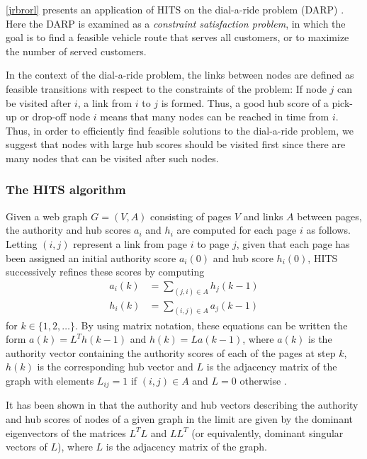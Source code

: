 \documentclass[dissertation,draft*]{aaltoseries}
\begin{document}
\ref{jrbrorl} presents an application of HITS on the dial-a-ride problem (DARP)
\cite{berbegliathesis,berbegliahybrid,berbegliafeas}.
Here the DARP is examined as a \emph{constraint satisfaction problem}, in which the goal
is to find a feasible vehicle route that serves all customers, or to maximize the number of served customers.

In the context of the dial-a-ride problem, 
the links between nodes are defined as feasible transitions with respect to the %
constraints of the problem: If node $j$ can be visited after $i$, a link from $i$ to $j$ 
is formed. Thus, a good hub score of a pick-up or drop-off node $i$ means 
that many nodes can be reached in time from $i$. 
Thus, in order to efficiently find feasible solutions to the dial-a-ride problem, we suggest that nodes with large 
hub scores should be visited first since there are many nodes that can
be visited after such nodes. 


\subsubsection{The HITS algorithm \cite{kleinberg}}
\label{hits}
Given a web graph $G = (V,A)$ consisting of pages $V$ and links $A$ between pages,
the authority and hub scores $a_i$ and $h_i$ are computed for each page $i$ as follows.
Letting 
$(i,j)$ represent a link from page $i$ to page $j$, given that each page has been 
assigned an initial authority score $a_i(0)$ and hub score $h_i(0)$, HITS successively
refines these scores by computing
\begin{align*}
a_i(k) & = \sum_{(j,i) \in A} h_j(k-1) \\
h_i(k) & = \sum_{(i,j) \in A} a_j(k-1)
\end{align*}
for $k \in \{1,2,\ldots\}$. By using matrix notation, these equations can be written the form 
$a(k) = L^T h(k-1)$ and $h(k) = L a(k-1)$,
where $a(k)$ is the authority vector containing the authority scores of
each of the pages at step $k$, $h(k)$ is the corresponding hub vector and
$L$ is the adjacency matrix of the graph with elements $L_{ij} = 1$ if
$(i,j) \in A$ and $L=0$ otherwise \cite{langville}. 

It has been shown in \cite{farahat} that the authority and hub vectors
describing the authority and hub scores of nodes of a given graph in the limit are given by 
the dominant eigenvectors of the matrices $L^TL$ and $LL^T$ 
(or equivalently, dominant singular vectors of $L$), 
where $L$ is the adjacency matrix of the graph. 
\end{document}
